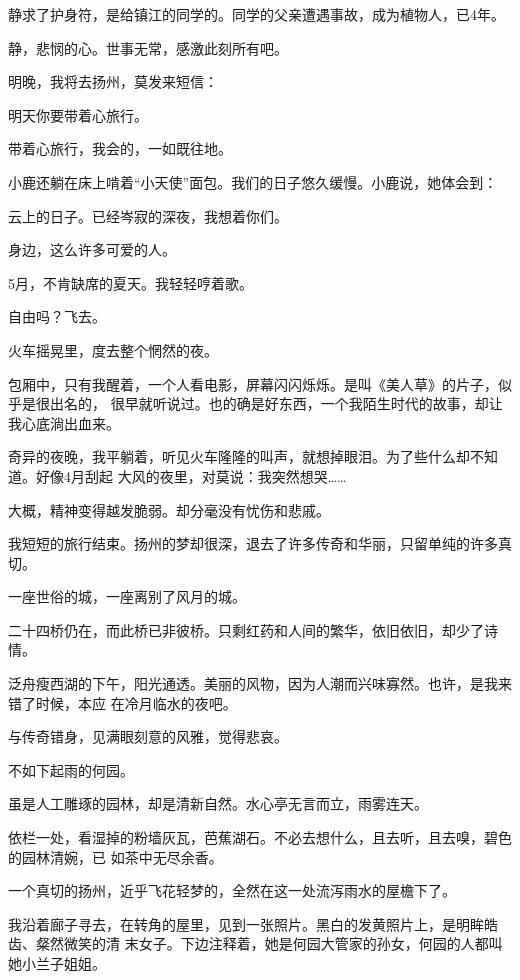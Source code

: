 \documentclass[12pt,a4paper]{article}
\begin{document}
		静求了护身符，是给镇江的同学的。同学的父亲遭遇事故，成为植物人，已4年。

		静，悲悯的心。世事无常，感激此刻所有吧。

		明晚，我将去扬州，莫发来短信：

		明天你要带着心旅行。

		带着心旅行，我会的，一如既往地。

		小鹿还躺在床上啃着“小天使”面包。我们的日子悠久缓慢。小鹿说，她体会到：

		云上的日子。已经岑寂的深夜，我想着你们。

		身边，这么许多可爱的人。

		5月，不肯缺席的夏天。我轻轻哼着歌。

		自由吗？飞去。

	\endwriting



		火车摇晃里，度去整个惘然的夜。

		包厢中，只有我醒着，一个人看电影，屏幕闪闪烁烁。是叫《美人草》的片子，似乎是很出名的，
	很早就听说过。也的确是好东西，一个我陌生时代的故事，却让我心底淌出血来。

		奇异的夜晚，我平躺着，听见火车隆隆的叫声，就想掉眼泪。为了些什么却不知道。好像4月刮起
	大风的夜里，对莫说：我突然想哭……

		大概，精神变得越发脆弱。却分毫没有忧伤和悲戚。

		我短短的旅行结束。扬州的梦却很深，退去了许多传奇和华丽，只留单纯的许多真切。

		一座世俗的城，一座离别了风月的城。

		二十四桥仍在，而此桥已非彼桥。只剩红药和人间的繁华，依旧依旧，却少了诗情。

		泛舟瘦西湖的下午，阳光通透。美丽的风物，因为人潮而兴味寡然。也许，是我来错了时候，本应
	在冷月临水的夜吧。

		与传奇错身，见满眼刻意的风雅，觉得悲哀。

		不如下起雨的何园。

		虽是人工雕琢的园林，却是清新自然。水心亭无言而立，雨雾连天。

		依栏一处，看湿掉的粉墙灰瓦，芭蕉湖石。不必去想什么，且去听，且去嗅，碧色的园林清婉，已
	如茶中无尽余香。

		一个真切的扬州，近乎飞花轻梦的，全然在这一处流泻雨水的屋檐下了。

		我沿着廊子寻去，在转角的屋里，见到一张照片。黑白的发黄照片上，是明眸皓齿、粲然微笑的清
	末女子。下边注释着，她是何园大管家的孙女，何园的人都叫她小兰子姐姐。
\end{document}
